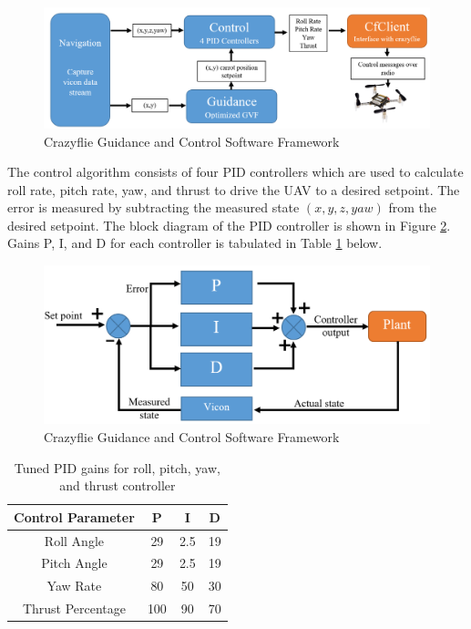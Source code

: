 \documentclass[numbered,pdftex]{ohio-etd}
\begin{document}
\begin{figure}[H]
	\centering
	\includegraphics[trim=0 0 1 0,clip,width=14cm]{PaperFigures/Methods/cfControlClass}
	\caption{Crazyflie Guidance and Control Software Framework}
	\label{fig:cfControlClass}
\end{figure}

The control algorithm consists of four PID controllers which are used to calculate roll rate, pitch rate, yaw, and thrust to drive the UAV to a desired setpoint. The error is measured by subtracting the measured state $(x,y,z,yaw)$ from the desired setpoint. The block diagram of the PID controller is shown in Figure \ref{fig:pid}. Gains P, I, and D for each controller is tabulated in Table \ref{table:pidGains} below. 



\begin{figure}[H]
	\centering
	\includegraphics[trim=0 0 0 0,clip,width=14cm]{PaperFigures/Methods/pid}
	\caption{Crazyflie Guidance and Control Software Framework}
	\label{fig:pid}
\end{figure}

\begin{table}[H]
	\centering
	\caption{Tuned PID gains for roll, pitch, yaw, and thrust controller}
	\label{table:pidGains}
	\begin{tabular}{|c|c|c|c|}
		\hline 
		Control Parameter & P & I & D \\ 
		\hline 
		Roll Angle & 29 & 2.5 & 19 \\ 
		\hline 
		Pitch Angle & 29 & 2.5 & 19 \\ 
		\hline 
		Yaw Rate & 80 & 50 & 30 \\ 
		\hline 
		Thrust Percentage & 100 & 90 & 70 \\ 
		\hline 
	\end{tabular}
\end{table}
 
\end{document}
